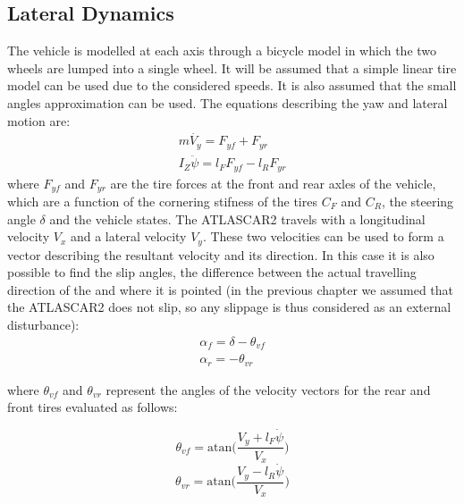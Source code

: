 \subsection{Lateral Dynamics}

The vehicle is modelled at each axis through a bicycle model in which the two wheels are lumped into a single wheel. It will be assumed that a simple linear tire model can be used due to the considered speeds. It is also assumed that the small angles approximation can be used.
The equations describing the yaw and lateral motion are:
\begin{equation}
	\label{eqn:yaw_lateral_motion}
	\begin{array}{ll}
	m\dot{V_y}=F_{yf}+F_{yr}\\
	I_Z\ddot{\psi}=l_FF_{yf}-l_RF_{yr}
	\end{array}
\end{equation}
where $F_{yf}$ and $F_{yr}$ are the tire forces at the front and rear axles of the vehicle, which are a function of the cornering stifness of the tires $C_F$ and $C_R$, the steering angle $\delta$ and the vehicle states.
The ATLASCAR2 travels with a longitudinal velocity $V_x$ and a lateral velocity $V_y$. These two velocities can be used to form a vector describing the resultant velocity and its direction. In this case it is also possible to find the slip angles, the difference between the actual travelling direction of the and where it is pointed (in the previous chapter we assumed that the ATLASCAR2 does not slip, so any slippage is thus considered as an external disturbance):
\begin{equation}
	\label{eqn:alpha_f_alpha_r}
	\begin{array}{ll}
	\alpha_f = \delta-\theta_{vf}\\
	\alpha_r = -\theta_{vr}
	\end{array}
\end{equation}

where $\theta_{vf}$ and $\theta_{vr}$ represent the angles of the velocity vectors for the rear and front tires evaluated as follows:

\begin{equation}
\label{eqn:theta_vf}
\theta_{vf}=\text{atan}\Bigg(\frac{V_y+l_F\dot{\psi}}{V_x}\Bigg)
\end{equation}
\begin{equation}
\label{eqn:theta_vr}
\theta_{vr}=\text{atan}\Bigg(\frac{V_y-l_R\dot{\psi}}{V_x}\Bigg)
\end{equation}


